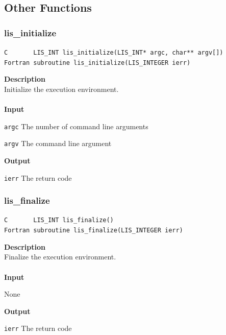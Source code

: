 \documentclass[a4paper]{article}
\newcommand{\namelistlabel}[1]{\mbox{#1}\hfill}
\newenvironment{namelist}[1]{%
\begin{list}{}
  {\let\makelabel\namelistlabel
  \settowidth{\labelwidth}{#1}
  \setlength{\leftmargin}{1.1\labelwidth}}
  }{%
\end{list}}
\begin{document}
\newpage
\subsection{Other Functions}
\subsubsection{lis\_initialize}
\begin{screen}
\verb|C       LIS_INT lis_initialize(LIS_INT* argc, char** argv[])|\\
\verb|Fortran subroutine lis_initialize(LIS_INTEGER ierr)|
\end{screen}
{\bf Description}\\
\indent
Initialize the execution environment.
\\ \\
\noindent
{\bf Input}
\begin{namelist}{XXXXXXXXXXXXXXXXXXXX}
\item[\tt argc] The number of command line arguments
\item[\tt argv] The command line argument
\end{namelist}
{\bf Output}
\begin{namelist}{XXXXXXXXXXXXXXXXXXXX}
\item[\tt ierr] The return code
\end{namelist}

\subsubsection{lis\_finalize}
\begin{screen}
\verb|C       LIS_INT lis_finalize()|\\
\verb|Fortran subroutine lis_finalize(LIS_INTEGER ierr)|
\end{screen}
{\bf Description}\\
\indent
Finalize the execution environment.
\\ \\
\noindent
{\bf Input}
\begin{namelist}{XXXXXXXXXXXXXXXXXXXX}
\item[None] 
\end{namelist}
{\bf Output}
\begin{namelist}{XXXXXXXXXXXXXXXXXXXX}
\item[\tt ierr] The return code
\end{namelist}

\newpage
\end{document}
